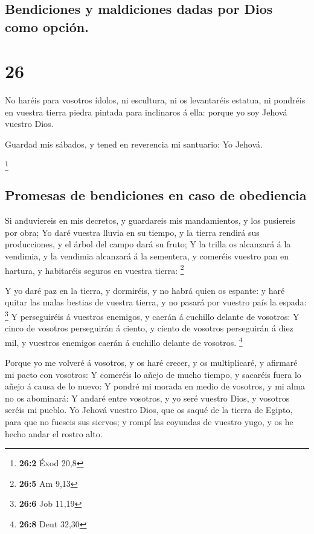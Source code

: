\hypertarget{bendiciones-y-maldiciones-dadas-por-dios-como-opciuxf3n.}{%
\subsection{Bendiciones y maldiciones dadas por Dios como
opción.}\label{bendiciones-y-maldiciones-dadas-por-dios-como-opciuxf3n.}}

\hypertarget{section-25}{%
\section{26}\label{section-25}}

 No haréis para vosotros ídolos, ni escultura, ni os
levantaréis estatua, ni pondréis en vuestra tierra piedra pintada para
inclinaros á ella: porque yo soy Jehová vuestro Dios.

 Guardad mis sábados, y tened en reverencia mi santuario: Yo
Jehová.

\footnote{\textbf{26:2} Éxod 20,8}

\hypertarget{promesas-de-bendiciones-en-caso-de-obediencia}{%
\subsection{Promesas de bendiciones en caso de
obediencia}\label{promesas-de-bendiciones-en-caso-de-obediencia}}

 Si anduviereis en mis decretos, y guardareis mis
mandamientos, y los pusiereis por obra;  Yo daré vuestra
lluvia en su tiempo, y la tierra rendirá sus producciones, y el árbol
del campo dará su fruto;  Y la trilla os alcanzará á la
vendimia, y la vendimia alcanzará á la sementera, y comeréis vuestro pan
en hartura, y habitaréis seguros en vuestra tierra: \footnote{\textbf{26:5}
  Am 9,13}

 Y yo daré paz en la tierra, y dormiréis, y no habrá quien
os espante: y haré quitar las malas bestias de vuestra tierra, y no
pasará por vuestro país la espada: \footnote{\textbf{26:6} Job 11,19}
 Y perseguiréis á vuestros enemigos, y caerán á cuchillo
delante de vosotros:  Y cinco de vosotros perseguirán á
ciento, y ciento de vosotros perseguirán á diez mil, y vuestros enemigos
caerán á cuchillo delante de vosotros. \footnote{\textbf{26:8} Deut
  32,30}

 Porque yo me volveré á vosotros, y os haré crecer, y os
multiplicaré, y afirmaré mi pacto con vosotros:  Y comeréis
lo añejo de mucho tiempo, y sacaréis fuera lo añejo á causa de lo nuevo:
 Y pondré mi morada en medio de vosotros, y mi alma no os
abominará:  Y andaré entre vosotros, y yo seré vuestro
Dios, y vosotros seréis mi pueblo.  Yo Jehová vuestro Dios,
que os saqué de la tierra de Egipto, para que no fueseis sus siervos; y
rompí las coyundas de vuestro yugo, y os he hecho andar el rostro alto.

